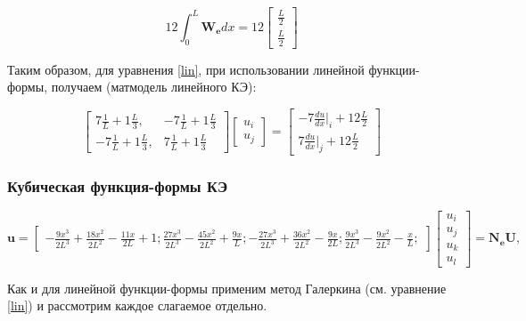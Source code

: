 $$12\int_0^L \mathbf{W_e} d x= 12
\begin{bmatrix}
	\frac{L}{2} \\
	\frac{L}{2}
\end{bmatrix}
$$

Таким образом, для уравнения \ref{lin}, при использовании линейной функции-формы,  получаем (матмодель линейного КЭ):

$$
\begin{bmatrix}
	7\frac{1}{L}    +1 \frac{L}{3}  , &   -7 \frac{1}{L}    +1 \frac{L}{3}   \\
	  -7  \frac{1}{L}   +1 \frac{L}{3}  , &  7\frac{1}{L}    +1 \frac{L}{3}  
\end{bmatrix}
\begin{bmatrix}
	u_i \\
	u_j
\end{bmatrix}=
\begin{bmatrix}
	  -7 \frac{du}{dx}|_i   +12  \frac{L}{2}\\
	7\frac{du}{dx}|_j   +12  \frac{L}{2}
\end{bmatrix}
$$


\subsubsection{Кубическая функция-формы КЭ}
$$
\mathbf{u}=\begin{bmatrix}
-\frac{9x^3}{2L^3}+\frac{18x^2}{2L^2}-\frac{11x}{2L} + 1;
\frac{27x^3}{2L^3}-\frac{45x^2}{2L^2}+\frac{9x}{L};
-\frac{27x^3}{2L^3}+\frac{36x^2}{2L^2}-\frac{9x}{2L};
\frac{9x^3}{2L^3}-\frac{9x^2}{2L^2}-\frac{x}{L};
\end{bmatrix}
\begin{bmatrix}
u_i \\
u_j\\
u_k\\
u_l
\end{bmatrix}
=\mathbf{N_eU},
$$

Как и для линейной функции-формы применим метод Галеркина (см. уравнение \ref{lin}) и рассмотрим каждое слагаемое отдельно.

